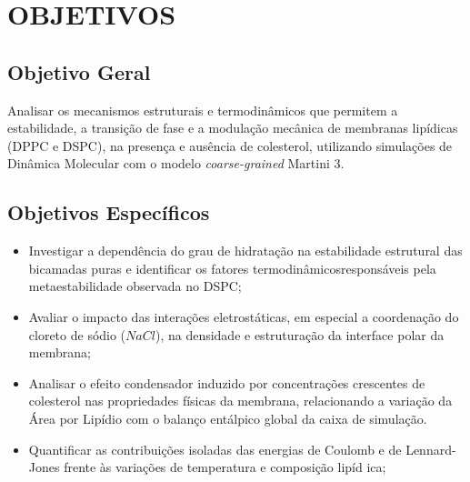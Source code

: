 \section{OBJETIVOS}
\subsection{Objetivo Geral}
Analisar os mecanismos estruturais e termodinâmicos que permitem  a estabilidade, a transição de fase e a modulação mecânica de membranas lipídicas (DPPC e DSPC), na presença e ausência de colesterol, utilizando simulações de Dinâmica Molecular com o modelo \textit{coarse-grained} Martini 3.

\subsection{Objetivos Específicos}
\begin{itemize}
     \item Investigar a dependência do grau de hidratação na estabilidade estrutural das bicamadas puras e identificar os fatores termodinâmicosresponsáveis pela metaestabilidade observada no DSPC;
    \item Avaliar o impacto das interações eletrostáticas, em especial a coordenação do cloreto de sódio ($NaCl$), na densidade e estruturação da interface polar da membrana;
    \item Analisar o efeito condensador induzido por concentrações crescentes de colesterol nas propriedades físicas da membrana, relacionando a variação da Área por Lipídio com o balanço entálpico global da caixa de simulação.
     \item Quantificar as contribuições isoladas das energias de Coulomb e de Lennard-Jones frente às variações de temperatura e composição lipíd
   ica;
\end{itemize}
